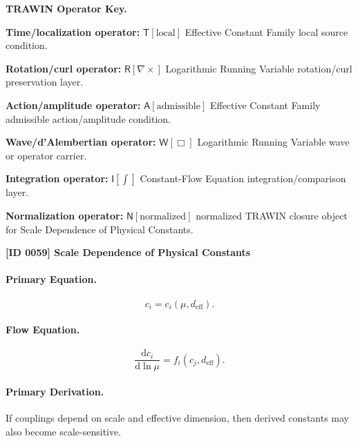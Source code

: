 \par\vspace{0.45\baselineskip}
\noindent\begin{minipage}[t]{\linewidth}
\begingroup
\small
\raggedright
\textbf{TRAWIN Operator Key.}\par
\noindent\textbf{Time/localization operator:} $\mathsf{T}\!\left[\mathrm{local}\right]$ Effective Constant Family local source condition.\par
\noindent\textbf{Rotation/curl operator:} $\mathsf{R}\!\left[\nabla\times\right]$ Logarithmic Running Variable rotation/curl preservation layer.\par
\noindent\textbf{Action/amplitude operator:} $\mathsf{A}\!\left[\mathrm{admissible}\right]$ Effective Constant Family admissible action/amplitude condition.\par
\noindent\textbf{Wave/d'Alembertian operator:} $\mathsf{W}\!\left[\Box\right]$ Logarithmic Running Variable wave or operator carrier.\par
\noindent\textbf{Integration operator:} $\mathsf{I}\!\left[\int\right]$ Constant-Flow Equation integration/comparison layer.\par
\noindent\textbf{Normalization operator:} $\mathsf{N}\!\left[\mathrm{normalized}\right]$ normalized TRAWIN closure object for Scale Dependence of Physical Constants.\par
\endgroup
\end{minipage}

\clearpage
\noindent\textbf{[ID 0059] Scale Dependence of Physical Constants}\par
\vspace{0.35em}
\paragraph{Primary Equation.}
\begin{equation}
c_i=c_i(\mu,d_{\mathrm{eff}}).
\end{equation}

\paragraph{Flow Equation.}
\begin{equation}
\frac{\mathrm{d}c_i}{\mathrm{d}\ln\mu}
=
f_i(c_j,d_{\mathrm{eff}}).
\end{equation}

\paragraph{Primary Derivation.}
If couplings depend on scale and effective dimension, then derived constants may also become scale-sensitive.

